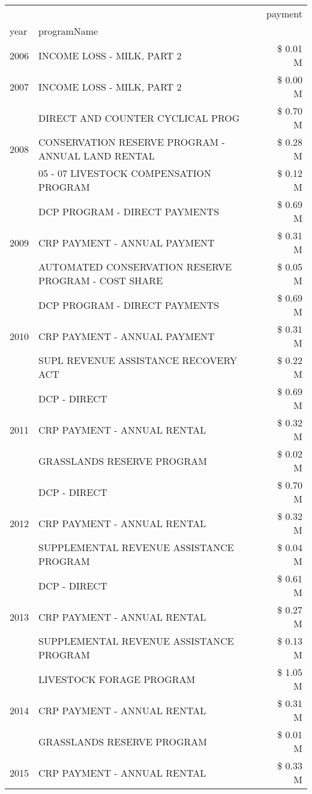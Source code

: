 \begin{tabular}{llr}
\toprule
 &  & payment \\
year & programName &  \\
\midrule
2006 & INCOME LOSS - MILK, PART 2 & \$ 0.01 M \\
\cline{1-3}
2007 & INCOME LOSS - MILK, PART 2 & \$ 0.00 M \\
\cline{1-3}
\multirow[t]{3}{*}{2008} & DIRECT AND COUNTER CYCLICAL PROG & \$ 0.70 M \\
 & CONSERVATION RESERVE PROGRAM - ANNUAL LAND RENTAL & \$ 0.28 M \\
 & 05 - 07 LIVESTOCK COMPENSATION PROGRAM & \$ 0.12 M \\
\cline{1-3}
\multirow[t]{3}{*}{2009} & DCP PROGRAM - DIRECT PAYMENTS & \$ 0.69 M \\
 & CRP PAYMENT - ANNUAL PAYMENT & \$ 0.31 M \\
 & AUTOMATED CONSERVATION RESERVE PROGRAM - COST SHARE & \$ 0.05 M \\
\cline{1-3}
\multirow[t]{3}{*}{2010} & DCP PROGRAM - DIRECT PAYMENTS & \$ 0.69 M \\
 & CRP PAYMENT - ANNUAL PAYMENT & \$ 0.31 M \\
 & SUPL REVENUE ASSISTANCE RECOVERY ACT & \$ 0.22 M \\
\cline{1-3}
\multirow[t]{3}{*}{2011} & DCP - DIRECT & \$ 0.69 M \\
 & CRP PAYMENT - ANNUAL RENTAL & \$ 0.32 M \\
 & GRASSLANDS RESERVE PROGRAM & \$ 0.02 M \\
\cline{1-3}
\multirow[t]{3}{*}{2012} & DCP - DIRECT & \$ 0.70 M \\
 & CRP PAYMENT - ANNUAL RENTAL & \$ 0.32 M \\
 & SUPPLEMENTAL REVENUE ASSISTANCE PROGRAM & \$ 0.04 M \\
\cline{1-3}
\multirow[t]{3}{*}{2013} & DCP - DIRECT & \$ 0.61 M \\
 & CRP PAYMENT - ANNUAL RENTAL & \$ 0.27 M \\
 & SUPPLEMENTAL REVENUE ASSISTANCE PROGRAM & \$ 0.13 M \\
\cline{1-3}
\multirow[t]{3}{*}{2014} & LIVESTOCK FORAGE PROGRAM & \$ 1.05 M \\
 & CRP PAYMENT - ANNUAL RENTAL & \$ 0.31 M \\
 & GRASSLANDS RESERVE PROGRAM & \$ 0.01 M \\
\cline{1-3}
\multirow[t]{3}{*}{2015} & CRP PAYMENT - ANNUAL RENTAL & \$ 0.33 M \\

\end{tabular}
